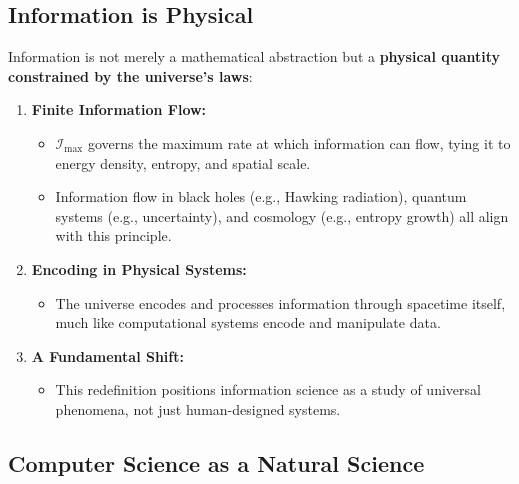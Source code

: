 \documentclass[12pt]{article}
\begin{document}
\subsection{Information is Physical}

Information is not merely a mathematical abstraction but a \textbf{physical quantity constrained by the universe’s laws}:
\begin{enumerate}
    \item \textbf{Finite Information Flow:}
    \begin{itemize}
        \item $\mathcal{I}_{\text{max}}$ governs the maximum rate at which information can flow, tying it to energy density, entropy, and spatial scale.
        \item Information flow in black holes (e.g., Hawking radiation), quantum systems (e.g., uncertainty), and cosmology (e.g., entropy growth) all align with this principle.
    \end{itemize}

    \item \textbf{Encoding in Physical Systems:}
    \begin{itemize}
        \item The universe encodes and processes information through spacetime itself, much like computational systems encode and manipulate data.
    \end{itemize}

    \item \textbf{A Fundamental Shift:}
    \begin{itemize}
        \item This redefinition positions information science as a study of universal phenomena, not just human-designed systems.
    \end{itemize}
\end{enumerate}

\subsection{Computer Science as a Natural Science}
\end{document}

